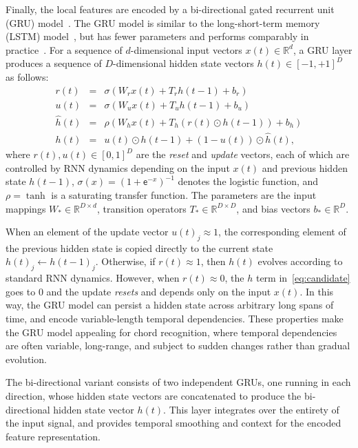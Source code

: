 \documentclass{article}
\begin{document}
Finally, the local features are encoded by a bi-directional gated recurrent unit (GRU) model~\cite{cho2014learning}.
The GRU model is similar to the long-short-term memory (LSTM) model~\cite{hochreiter1997long}, but has fewer parameters and performs comparably in practice~\cite{jozefowicz2015empirical}.
For a sequence of $d$-dimensional input vectors $x(t) \in \mathbb{R}^d$, a GRU layer produces a sequence of $D$-dimensional hidden state vectors $h(t) \in {[-1, +1]}^D$ as follows:
\begin{eqnarray}
    r(t) &=& \sigma\left(W_r x(t) + T_r h(t-1) + b_r\right)\\
    u(t) &=& \sigma\left(W_u x(t) + T_u h(t-1) + b_u\right)\\
    \hat{h}(t) &=& \rho\left(W_h x(t) + T_h \left( r(t) \odot h(t-1) \right) + b_h \right)\label{eq:candidate}\\
    h(t) &=& u(t) \odot h(t-1) + (1-u(t)) \odot \hat{h}(t),
\end{eqnarray}
where $r(t), u(t) \in {[0,1]}^D$ are the \emph{reset} and \emph{update} vectors, each of which are controlled by RNN dynamics depending on the input $x(t)$ and previous hidden state $h(t-1)$, ${\sigma(x)={(1+\mathsf{e}^{-x})}^{-1}}$ denotes the logistic function, and $\rho = \tanh$ is a saturating transfer function.
The parameters are the input mappings $W_* \in \mathbb{R}^{D\times d}$, transition operators $T_* \in \mathbb{R}^{D\times D}$, and bias vectors $b_* \in \mathbb{R}^D$.

When an element of the update vector ${u(t)}_j \approx 1$, the corresponding element of the previous hidden state is copied directly to the current state ${h(t)}_j \leftarrow {h(t-1)}_j$.
Otherwise, if $r(t) \approx 1$, then $h(t)$ evolves according to standard RNN dynamics.
However, when $r(t) \approx 0$, the $h$ term in~\eqref{eq:candidate} goes to 0 and the update \emph{resets} and depends only on the input $x(t)$.
In this way, the GRU model can persist a hidden state across arbitrary long spans of time, and encode variable-length temporal dependencies.
These properties make the GRU model appealing for chord recognition, where temporal dependencies are often variable, long-range, and subject to sudden changes rather than gradual evolution.

The bi-directional variant consists of two independent GRUs, one running in each direction, whose hidden state vectors are concatenated to produce the bi-directional hidden state vector $h(t)$.
This layer integrates over the entirety of the input signal, and provides temporal smoothing and context for the encoded feature representation.
\end{document}
